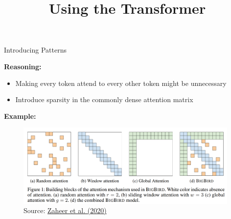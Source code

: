 



\newcommand{\titlefigure}{figure/sesamestreet.jpeg}
\newcommand{\learninggoals}{
\item Understand subtleties of Self-Attention
\item BigBird architecture using patterns}

\title{Using the Transformer}
\date{}




\begin{frame}{Introducing Patterns}

\textbf{Reasoning:} 

\begin{itemize}
	\item Making every token attend to every other token might be unnecessary
	\item Introduce sparsity in the commonly dense attention matrix
\end{itemize}

\textbf{Example:}

	\begin{figure}
		\centering
		\includegraphics[width = 11cm]{figure/bigbird-patterns.png}\\ 
		{\footnotesize Source: \href{https://proceedings.neurips.cc//paper/2020/file/c8512d142a2d849725f31a9a7a361ab9-Paper.pdf}{Zaheer et al. (2020)}}
	\end{figure}
\end{frame}




\endlecture

